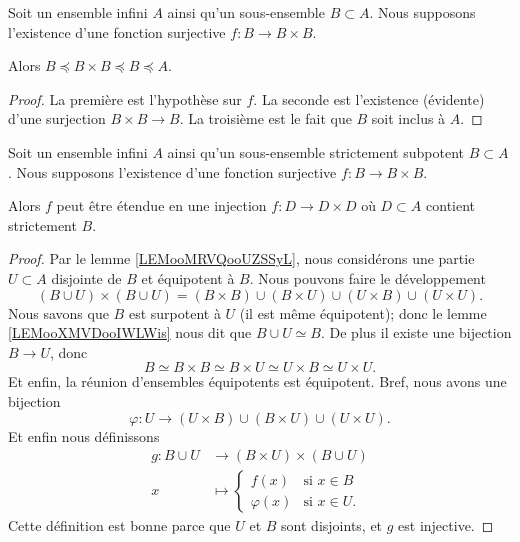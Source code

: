 \begin{lemma}
    Soit un ensemble infini \( A\) ainsi qu'un sous-ensemble \( B\subset A\). Nous supposons l'existence d'une fonction surjective \( f\colon B\to B\times B\).

    Alors \( B\preceq B\times B\preceq B\preceq A\).
\end{lemma}

\begin{proof}
    La première est l'hypothèse sur \( f\). La seconde est l'existence (évidente) d'une surjection \( B\times B\to B\). La troisième est le fait que \( B\) soit inclus à \( A\).
\end{proof}

\begin{lemma}     \label{LEMooPOEFooXaifhT}
    Soit un ensemble infini \( A\) ainsi qu'un sous-ensemble strictement subpotent \( B\subset A\). Nous supposons l'existence d'une fonction surjective \( f\colon B\to B\times B\).

    Alors \( f\) peut être étendue en une injection \( f\colon D\to D\times D\) où \( D\subset A\) contient strictement \( B\).
\end{lemma}

\begin{proof}
    Par le lemme \ref{LEMooMRVQooUZSSyL}, nous considérons une partie \( U\subset A\) disjointe de \( B\) et équipotent à \( B\). Nous pouvons faire le développement
    \begin{equation}
        (B\cup U)\times (B\cup U)=(B\times B)\cup(B\times U)\cup (U\times B)\cup (U\times U).
    \end{equation}
    Nous savons que \( B\) est surpotent à \( U\) (il est même équipotent); donc le lemme \ref{LEMooXMVDooIWLWis} nous dit que \( B\cup U\simeq B\). De plus il existe une bijection \( B\to U\), donc 
    \begin{equation}
        B\simeq B\times B\simeq B\times U\simeq U\times B\simeq U\times U.
    \end{equation}
    Et enfin, la réunion d'ensembles équipotents est équipotent. Bref, nous avons une bijection
    \begin{equation}
        \varphi\colon U\to (U\times B)\cup (B\times U)\cup (U\times U).
    \end{equation}
    Et enfin nous définissons
    \begin{equation}
        \begin{aligned}
            g\colon B\cup U&\to (B\times U)\times (B\cup U) \\
            x&\mapsto \begin{cases}
                f(x)    &   \text{si }  x\in B\\
                \varphi(x)    &    \text{si } x\in U.
            \end{cases}
        \end{aligned}
    \end{equation}
    Cette définition est bonne parce que \( U\) et \( B\) sont disjoints, et \( g\) est injective.
\end{proof}


